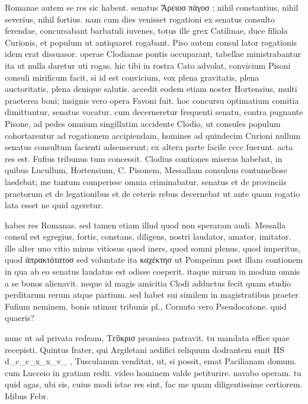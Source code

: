  Romanae autem se res sic habent. senatus Ἄρειοσ πάγοσ ; nihil constantius, nihil severius, nihil fortius. nam cum dies venisset rogationi ex senatus consulto ferendae, concursabant barbatuli iuvenes, totus ille grex Catilinae, duce filiola Curionis, et populum ut antiquaret rogabant. Piso autem consul lator rogationis idem erat dissuasor. operae Clodianae pontis occuparant, tabellae ministrabantur ita ut nulla daretur uti rogas. hic tibi in rostra Cato advolat, convicium Pisoni consuli mirificum facit, si id est convicium, vox plena gravitatis, plena auctoritatis, plena denique salutis. accedit eodem etiam noster Hortensius, multi praeterea boni; insignis vero opera Favoni fuit. hoc concursu optimatium comitia dimittuntur, senatus vocatur. cum decerneretur frequenti senatu, contra pugnante Pisone, ad pedes omnium singillatim accidente Clodio, ut consules populum cohortarentur ad rogationem accipiendam, homines ad quindecim Curioni nullum senatus consultum facienti adsenserunt; ex altera parte facile cccc fuerunt. acta res est. Fufius tribunus tum concessit. Clodius contiones miseras habebat, in quibus Lucullum, Hortensium, C. Pisonem, Messallam consulem contumeliose laedebat; me tantum comperisse omnia criminabatur. senatus et de provinciis praetorum et de legationibus et de ceteris rebus decernebat ut ante quam rogatio lata esset ne quid ageretur.

 habes res Romanas. sed tamen etiam illud quod non speraram audi. Messalla consul est egregius, fortis, constans, diligens, nostri laudator, amator, imitator. ille alter uno vitio minus vitiosus quod iners, quod somni plenus, quod imperitus, quod ἀπρακτότατοσ sed voluntate ita καχέκτησ ut Pompeium post illam contionem in qua ab eo senatus laudatus est odisse coeperit. itaque mirum in modum omnis a se bonos alienavit. neque id magis amicitia Clodi adductus fecit quam studio perditarum rerum atque partium. sed habet sui similem in magistratibus praeter Fufium neminem. bonis utimur tribunis pl., Cornuto vero Pseudocatone. quid quaeris?

 nunc ut ad privata redeam, Τεῦκρισ promissa patravit. tu mandata effice quae recepisti. Quintus frater, qui Argiletani aedifici reliquum dodrantem emit HS d_c_c_x_x_v_ , Tusculanum venditat, ut, si possit, emat Pacilianam domum. cum Lucceio in gratiam redii. video hominem valde petiturire. navabo operam. tu quid agas, ubi sis, cuius modi istae res sint, fac me quam diligentissime certiorem. Idibus Febr.
